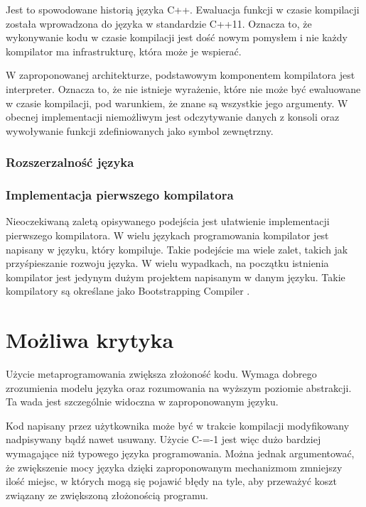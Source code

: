 \documentclass[conference]{IEEEtran}
\begin{document}
Jest to spowodowane historią języka C++.
Ewaluacja funkcji w czasie kompilacji została wprowadzona do języka w standardzie C++11.
Oznacza to, że wykonywanie kodu w czasie kompilacji jest dość nowym pomysłem i nie każdy kompilator ma infrastrukturę, która może je wspierać.

W zaproponowanej architekturze, podstawowym komponentem kompilatora jest interpreter.
Oznacza to, że nie istnieje wyrażenie, które nie może być ewaluowane w czasie kompilacji, pod warunkiem, że znane są wszystkie jego argumenty.
W obecnej implementacji niemożliwym jest odczytywanie danych z konsoli oraz wywoływanie funkcji zdefiniowanych jako symbol zewnętrzny.

\subsubsection{Rozszerzalność języka}

\subsubsection{Implementacja pierwszego kompilatora}

Nieoczekiwaną zaletą opisywanego podejścia jest ułatwienie implementacji pierwszego kompilatora.
W wielu językach programowania kompilator jest napisany w języku, który kompiluje.
Takie podejście ma wiele zalet, takich jak przyśpieszanie rozwoju języka.
W wielu wypadkach, na początku istnienia kompilator jest jedynym dużym projektem napisanym w danym języku.
Takie kompilatory są określane jako Bootstrapping Compiler \cite{b1}.




\section{Możliwa krytyka}

Użycie metaprogramowania zwiększa złożoność kodu.
Wymaga dobrego zrozumienia modelu języka oraz rozumowania na wyższym poziomie abstrakcji.
Ta wada jest szczególnie widoczna w zaproponowanym języku.

Kod napisany przez użytkownika może być w trakcie kompilacji modyfikowany nadpisywany bądź nawet usuwany.
Użycie C-=-1 jest więc dużo bardziej wymagające niż typowego języka programowania.
Można jednak argumentować, że zwiększenie mocy języka dzięki zaproponowanym mechanizmom zmniejszy ilość miejsc, w których mogą się pojawić błędy na tyle, aby przeważyć koszt związany ze zwiększoną złożonością programu.
\end{document}
